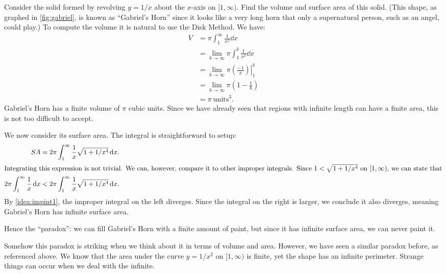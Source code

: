 \begin{example}\label{ex_gabriel}%
Consider the solid formed by revolving $y=1/x$ about the $x$-axis on $[1,\infty)$. Find the volume and surface area of this solid. (This shape, as graphed in \autoref{fig:gabriel}, is known as ``Gabriel's Horn'' since it looks like a very long horn that only a supernatural person, such as an angel, could play.)
\solution
To compute the volume it is natural to use the Disk Method. We have:
\begin{align*}
V &= \pi\int_1^\infty \frac{1}{x^2}\dd x \\
	&= \lim_{b\to\infty}\pi\int_1^b\frac{1}{x^2}\dd x \\
	&=	\lim_{b\to\infty} \left.\pi\left(\frac{-1}{x}\right)\right|_1^b \\
	&= \lim_{b\to\infty} \pi\left(1-\frac1b\right) \\
	&= \pi \ \text{units}^3.
\end{align*}
Gabriel's Horn has a finite volume of $\pi$ cubic units. Since we have already seen that regions with infinite length can have a finite area, this is not too difficult to accept.

We now consider its surface area. The integral is straightforward to setup:
\begin{align*}
SA &= 2\pi\int_1^\infty \frac{1}{x}\sqrt{1+1/x^4}\operatorname{d}\! x.\\
\intertext{Integrating this expression is not trivial. We can, however, compare it to other improper integrals. Since \(1< \sqrt{1+1/x^4}\) on \([1,\infty)\), we can state that}
2\pi\int_1^\infty \frac{1}{x}\operatorname{d}\! x &<2\pi\int_1^\infty \frac{1}{x}\sqrt{1+1/x^4}\operatorname{d}\! x .
\end{align*}
By \autoref{idea:impint1}, the improper integral on the left diverges. Since the integral on the right is larger, we conclude it also diverges, meaning Gabriel's Horn has infinite surface area.

Hence the ``paradox'': we can fill Gabriel's Horn with a finite amount of paint, but since it has infinite surface area, we can never paint it.

Somehow this paradox is striking when we think about it in terms of volume and area. However, we have seen a similar paradox before, as referenced above. We know that the area under the curve $y=1/x^2$ on $[1,\infty)$ is finite, yet the shape has an infinite perimeter. Strange things can occur when we deal with the infinite.
\end{example}


